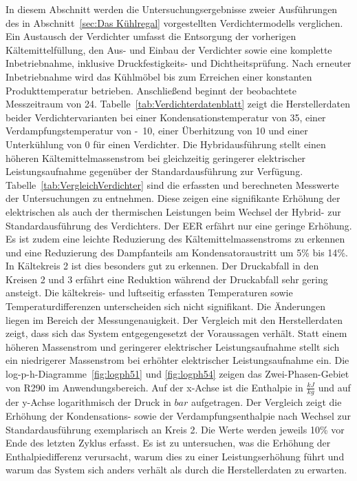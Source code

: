 In diesem Abschnitt werden die Untersuchungsergebnisse zweier Ausführungen des in Abschnitt~\ref{sec:Das Kühlregal} vorgestellten Verdichtermodells verglichen. 
Ein Austausch der Verdichter umfasst die Entsorgung der vorherigen Kältemittelfüllung, den Aus- und Einbau der Verdichter sowie eine komplette Inbetriebnahme, inklusive Druckfestigkeits- und Dichtheitsprüfung. Nach erneuter Inbetriebnahme wird das Kühlmöbel bis zum Erreichen einer konstanten Produkttemperatur betrieben. Anschließend beginnt der beobachtete Messzeitraum von \unit{24}{\hour}. \newline
Tabelle~\ref{tab:Verdichterdatenblatt} zeigt die Herstellerdaten beider Verdichtervarianten bei einer Kondensationstemperatur von \unit{35}{\celsius}, einer Verdampfungstemperatur von \unit{-10}{\celsius}, einer Überhitzung von \unit{10}{\kelvin} und einer Unterkühlung von \unit{0}{\kelvin} für einen Verdichter. Die Hybridausführung stellt einen höheren Kältemittelmassenstrom bei gleichzeitig geringerer elektrischer Leistungsaufnahme gegenüber der Standardausführung zur Verfügung. \newline
Tabelle~\ref{tab:VergleichVerdichter} sind die erfassten und berechneten Messwerte der Untersuchungen zu entnehmen. Diese zeigen eine signifikante Erhöhung der elektrischen als auch der thermischen Leistungen beim Wechsel der Hybrid- zur Standardausführung des Verdichters. Der EER erfährt nur eine geringe Erhöhung. Es ist zudem eine leichte Reduzierung des Kältemittelmassenstroms zu erkennen und eine Reduzierung des Dampfanteils am Kondensatoraustritt um \unit{5}{\%} bis \unit{14}{\%}. In Kältekreis 2 ist dies besonders gut zu erkennen. Der Druckabfall in den Kreisen 2 und 3 erfährt eine Reduktion während der Druckabfall sehr gering ansteigt. Die kältekreis- und luftseitig erfassten Temperaturen sowie Temperaturdifferenzen unterscheiden sich nicht signifikant. Die Änderungen liegen im Bereich der Messungenauigkeit. Der Vergleich mit den Herstellerdaten zeigt, dass sich das System entgegengesetzt der Voraussagen verhält. Statt einem höheren Massenstrom und geringerer elektrischer Leistungsaufnahme stellt sich ein niedrigerer Massenstrom bei erhöhter elektrischer Leistungsaufnahme ein. \newline
Die log-p-h-Diagramme~\ref{fig:logph51} und \ref{fig:logph54} zeigen das Zwei-Phasen-Gebiet von R290 im Anwendungsbereich. Auf der x-Achse ist die Enthalpie in $\frac{kJ}{kg}$ und auf der y-Achse logarithmisch der Druck in $bar$ aufgetragen. Der Vergleich zeigt die Erhöhung der Kondensations- sowie der Verdampfungsenthalpie nach Wechsel zur Standardausführung exemplarisch an Kreis 2. Die Werte werden jeweils \unit{10}{\%} vor Ende des letzten Zyklus erfasst. Es ist zu untersuchen, was die Erhöhung der Enthalpiedifferenz verursacht, warum dies zu einer Leistungserhöhung führt und warum das System sich anders verhält als durch die Herstellerdaten zu erwarten.

